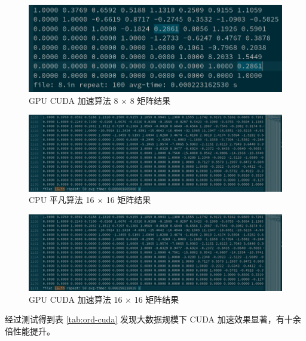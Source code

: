 \documentclass[a4paper]{article}
\begin{document}
\begin{figure}[h]
  \centering
  \includegraphics[width=\textwidth]{cuda8.png}
  \caption{GPU CUDA 加速算法 8 × 8 矩阵结果}
  \label{pic:cuda8}
\end{figure}

\begin{figure}[h]
  \centering
  \includegraphics[width=\textwidth]{ord16.png}
  \caption{CPU 平凡算法 16 × 16 矩阵结果}
  \label{pic:ord16}
\end{figure}

\begin{figure}[h]
  \centering
  \includegraphics[width=\textwidth]{cuda16.png}
  \caption{GPU CUDA 加速算法 16 × 16 矩阵结果}
  \label{pic:cuda16}
\end{figure}

经过测试得到表 \ref{tab:ord-cuda} 发现大数据规模下 CUDA 加速效果显著，有十余倍性能提升。
\end{document}
